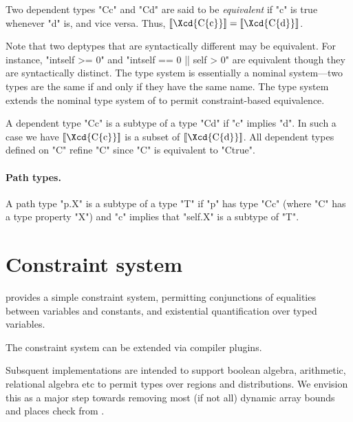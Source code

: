 Two dependent types \xcd"C{c}" and \xcd"C{d}" are said to be {\em equivalent} if 
\xcd"c" is true whenever \xcd"d" is, and vice versa. Thus, 
$\LL{\mbox{\Xcd{C\{c\}}}} = \LL{\mbox{\Xcd{C\{d\}}}}$.

Note that two deptypes that are syntactically different may be
equivalent. For instance, \xcd"int{self >= 0}" and
\xcd"int{self == 0 || self > 0}" are equivalent though they are syntactically
distinct. The \Java{} type system is essentially a nominal system---two
types are the same if and only if they have the same name. The \Xten{}
type system extends the nominal type system of \Java{} to permit
constraint-based equivalence.

A dependent type \xcd"C{c}" is a subtype of a type \xcd"C{d}" if
\xcd"c" implies \xcd"d".  In such a case we have
$\LL{\mbox{\Xcd{C\{c\}}}}$ is a
subset of $\LL{\mbox{\Xcd{C\{d\}}}}$. All dependent types defined on \xcd"C" refine
\xcd"C" since \xcd"C" is equivalent to \xcd"C{true}".

\paragraph{Path types.}

A path type \xcd"p.X" is a subtype of a type \xcd"T" if
\xcd"p" has type \xcd"C{c}" (where \xcd"C" has a type property
\xcd"X") and \xcd"c" implies that \xcd"self.X" is a subtype of \xcd"T".


\section{Constraint system}

\Xten{} provides a simple constraint system,  
permitting conjunctions of equalities between variables and
constants, and existential quantification over typed variables.

The constraint system can be extended via compiler plugins.

Subsquent implementations are intended to support boolean algebra,
arithmetic, relational algebra etc to permit types over regions and
distributions. We envision this as a major step towards removing most
(if not all) dynamic array bounds and places check from \Xten{}.





